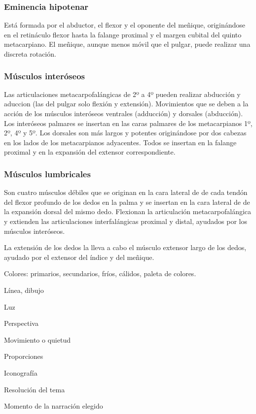 \subsubsection{Eminencia hipotenar}
Está formada por el abductor, el flexor y el oponente del meñique, originándose en el retináculo flexor hasta la falange proximal y el margen cubital del quinto metacarpiano. El meñique, aunque menos móvil que el pulgar, puede realizar una discreta rotación.

\subsubsection{Músculos interóseos}
Las articulaciones metacarpofalángicas de 2º a 4º pueden realizar abducción y aduccion (las del pulgar solo flexión y extensión). Movimientos que se deben a la acción de los músculos interóseos ventrales (adducción) y dorsales (abducción). Los interóseos palmares se insertan en las caras palmares de los metacarpianos 1º, 2º, 4º y 5º. Los dorsales son más largos y potentes originándose por dos cabezas en los lados de los metacarpianos adyacentes. Todos se insertan en la falange proximal y en la expansión del extensor correspondiente.

\subsubsection{Músculos lumbricales}
Son cuatro músculos débiles que se originan en la cara lateral de de cada tendón del flexor profundo de los dedos en la palma y se insertan en la cara lateral de de la expansión dorsal del mismo dedo. Flexionan la articulación metacarpofalángica y extienden las articulaciones interfalángicas proximal y distal, ayudados por los músculos interóseos.

La extensión de los dedos la lleva a cabo el músculo extensor largo de los dedos, ayudado por el extensor del índice y del meñique.

Colores: primarios, secundarios, fríos, cálidos, paleta de colores.

Línea, dibujo

Luz

Perspectiva

Movimiento o quietud

Proporciones

Iconografía

Resolución del tema

Momento de la narración elegido
